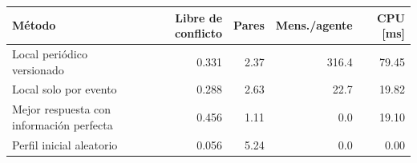 \begin{tabular}{lrrrr}
\toprule
Método & Libre de conflicto & Pares & Mens./agente & CPU [ms] \\
\midrule
Local periódico versionado & 0.331 & 2.37 & 316.4 & 79.45 \\
Local solo por evento & 0.288 & 2.63 & 22.7 & 19.82 \\
Mejor respuesta con información perfecta & 0.456 & 1.11 & 0.0 & 19.10 \\
Perfil inicial aleatorio & 0.056 & 5.24 & 0.0 & 0.00 \\
\bottomrule
\end{tabular}
